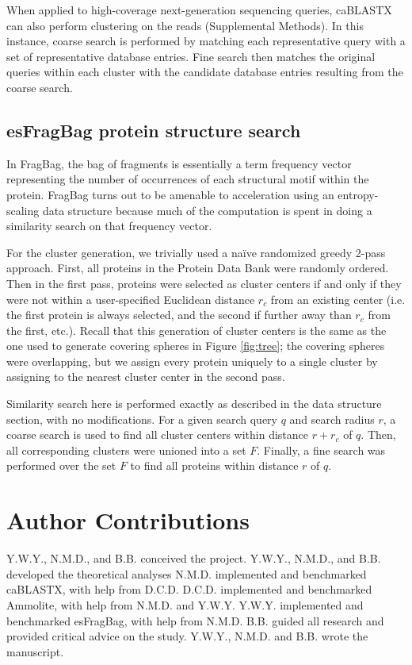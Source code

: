 \documentclass[review,preprint,12pt]{elsarticle}
\theoremstyle{definition}
\theoremstyle{remark}
\numberwithin{equation}{section}
\begin{document}
When applied to high-coverage next-generation sequencing queries, caBLASTX can also perform clustering on the reads (Supplemental Methods).
In this instance, coarse search is performed by matching each representative query with a set of representative database entries.
Fine search then matches the original queries within each cluster with the candidate database entries resulting from the coarse search.


\subsection{esFragBag protein structure search}
In FragBag, the bag of fragments is essentially
a term frequency vector representing the number of occurrences of each structural motif within the protein.
FragBag turns out to be amenable to acceleration using an entropy-scaling data structure because much of the computation is spent in doing a similarity search on that frequency vector.

For the cluster generation, we trivially used a na\"ive randomized greedy 2-pass approach.
First, all proteins in the Protein Data Bank were randomly ordered.
Then in the first pass, proteins were selected as cluster centers if and only if they were not within a user-specified Euclidean distance $r_c$ from an existing center (i.e. the first protein is always selected, and the second if further away than $r_c$ from the first, etc.).
Recall that this generation of cluster centers is the same as the one used to generate covering spheres in Figure \ref{fig:tree};
the covering spheres were overlapping, but we assign every protein uniquely to a single cluster by assigning to the nearest cluster center in the second pass.

Similarity search here is performed exactly as described in the data structure section, with no modifications.
For a given search query $q$ and search radius $r$,
a coarse search is used to find all cluster centers within distance $r+r_c$ of $q$.
Then, all corresponding clusters were unioned into a set $F$.
Finally, a fine search was performed over the set $F$ to find all proteins within distance $r$ of $q$.

\section{Author Contributions}
Y.W.Y., N.M.D., and B.B. conceived the project.
Y.W.Y., N.M.D., and B.B. developed the theoretical analyses
N.M.D. implemented and benchmarked caBLASTX, with help from D.C.D.
D.C.D. implemented and benchmarked Ammolite, with help from N.M.D. and Y.W.Y.
Y.W.Y. implemented and benchmarked esFragBag, with help from N.M.D.
B.B. guided all research and provided critical advice on the study.
Y.W.Y., N.M.D. and B.B. wrote the manuscript.
\end{document}
